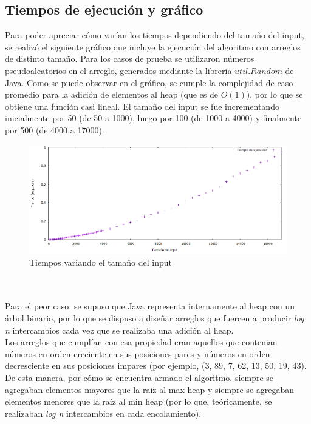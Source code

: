 \documentclass{article}
\begin{document}
	\subsection{Tiempos de ejecuci\'on y gr\'afico}
	Para poder apreciar c\'omo var\'ian los tiempos dependiendo del tamaño del input, se realiz\'o el siguiente gr\'afico que incluye la ejecuci\'on del algoritmo con arreglos de distinto tama\~no. Para los casos de prueba se utilizaron n\'umeros pseudoaleatorios en el arreglo, generados mediante la librer\'ia $util.Random$ de Java. Como se puede observar en el gr\'afico, se cumple la complejidad de caso promedio para la adici\'on de elementos al heap (que es de $O(1)$), por lo que se obtiene una funci\'on casi lineal. 
	El tama\~no del input se fue incrementando inicialmente por 50 (de 50 a 1000), luego por 100 (de 1000 a 4000) y finalmente por 500 (de 4000 a 17000).
	\begin{figure}
  		\centering
   	 	\includegraphics[width=1\textwidth]
   	 	{Imagenes/medianaTiempos.png}
		\caption{Tiempos variando el tama\~no del input}
	\end{figure}
	\\
	\newline
	\\Para el peor caso, se supuso que Java representa internamente al heap con un \'arbol binario, por lo que se dispuso a dise\~nar arreglos que fuercen a producir \textit{log n} intercambios cada vez que se realizaba una adici\'on al heap.
	\\Los arreglos que cumpl\'ian con esa propiedad eran aquellos que contenian n\'umeros en orden creciente en sus posiciones pares y n\'umeros en orden decresciente en sus posiciones impares (por ejemplo, (3, 89, 7, 62, 13, 50, 19, 43). De esta manera, por c\'omo se encuentra armado el algoritmo, siempre se agregaban elementos mayores que la ra\'iz al max heap y siempre se agregaban elementos menores que la ra\'iz al min heap (por lo que, te\'oricamente, se realizaban \textit{log n} intercambios en cada encolamiento).
\end{document}
